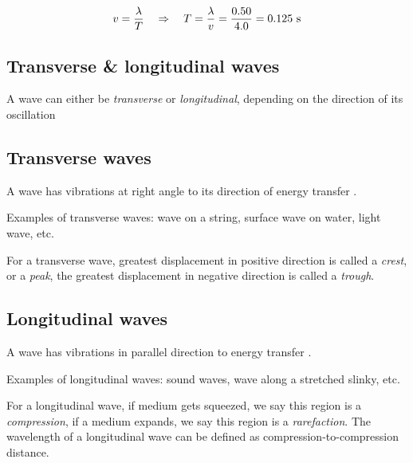 
\begin{soln} \begin{equation*}
	v = \frac{\lambda}{T} \quad \Rightarrow \quad T = \frac{\lambda}{v} = \frac{0.50}{4.0} = 0.125 \text{ s} 
\end{equation*}
\end{soln}

\subsection{Transverse \& longitudinal waves}

A wave can either be \emph{transverse} or \emph{longitudinal}, depending on the direction of its oscillation

\subsection{Transverse waves}

\begin{ilight}
	\centering A  wave has vibrations at right angle to its direction of energy transfer .
\end{ilight}

Examples of transverse waves: 
\titem wave on a string, 
\titem surface wave on water, 
\titem light wave, etc.

For a transverse wave, greatest displacement in positive direction is called a \emph{crest}, or a \emph{peak}, the greatest displacement in negative direction is called a \emph{trough}.


\subsection{Longitudinal waves} \label{ch-Lwaves}

\begin{ilight}
	\centering A  wave has vibrations in parallel direction to energy transfer .
\end{ilight}

Examples of longitudinal waves: 
\titem sound waves, 
\titem wave along a stretched slinky, etc.

For a longitudinal wave, if medium gets squeezed, we say this region is a \emph{compression}, if a medium expands, we say this region is a \emph{rarefaction}.  The wavelength of a longitudinal wave can be defined as compression-to-compression distance.

